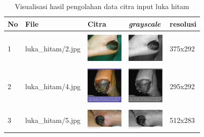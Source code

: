 \begin{table}[H]
	\centering
	\caption{Visualisasi hasil pengolahan data citra input luka hitam}
	\label{tabel_input}
	\begin{tabular}{|m{0.2in}|m{1.2in}|m{0.7in}|m{0.7in}|m{0.7in}|}
		\hline
		\textbf{No} & \textbf{File} & \textbf{Citra} & \textbf{\emph{grayscale}} & \textbf{resolusi} \\
		\hline
		
		& &  &  &\\
		1 & 
		luka\_hitam/2.jpg &
		\includegraphics[width=0.7in]{dataset/dataset_3/luka_hitam/ready/2.jpg}&
		\includegraphics[width=0.7in]{dataset/dataset_3/luka_hitam/ready/2_gray.jpg}&
		375x292\\
		\hline
		
		& &  &  &\\
		2 & 
		luka\_hitam/4.jpg &
		\includegraphics[width=0.7in]{dataset/dataset_3/luka_hitam/ready/4.jpg}&
		\includegraphics[width=0.7in]{dataset/dataset_3/luka_hitam/ready/4_gray.jpg}&
		295x292\\
		\hline
		
		& &  &  &\\
		3 & 
		luka\_hitam/5.jpg &
		\includegraphics[width=0.7in]{dataset/dataset_3/luka_hitam/ready/5.jpg}&
		\includegraphics[width=0.7in]{dataset/dataset_3/luka_hitam/ready/5_gray.jpg}&
		512x283\\
		\hline
		

\end{tabular}
\end{table}
